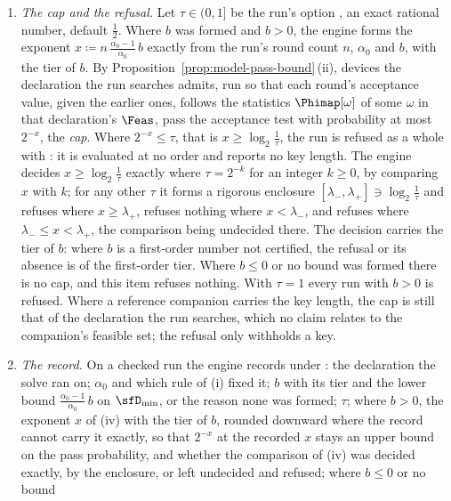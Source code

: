\begin{requirement}
\begin{enumerate}[label=(\roman*),leftmargin=2.4em]
  accounts for. Where $b\le0$, $f(\alpha')\coloneqq0$. Where no bound was
  formed, $f(\alpha')$ is not defined.
\item \emph{The cap and the refusal.} Let $\tau\in(0,1]$ be the run's option
  , an exact rational number, default
  $\frac12$. Where $b$ was formed and $b>0$, the engine forms the exponent
  $x\coloneqq n\,\frac{\alpha_0-1}{\alpha_0}\,b$ exactly from the run's
  round count $n$, $\alpha_0$ and $b$, with the tier of $b$. By
  Proposition~\ref{prop:model-pass-bound}\,(ii), devices the declaration the
  run searches admits, run so that each round's acceptance value, given the
  earlier ones, follows the statistics $\Phimap[\omega]$ of some $\omega$ in
  that declaration's $\Feas$, pass the acceptance test with probability at
  most $2^{-x}$, the \emph{cap}. Where $2^{-x}\le\tau$, that is
  $x\ge\log_2\frac1\tau$, the run is refused as a whole with
  : it is evaluated at no order and
  reports no key length. The engine decides $x\ge\log_2\frac1\tau$ exactly
  where $\tau=2^{-k}$ for an integer $k\ge0$, by comparing $x$ with $k$;
  for any other $\tau$ it forms a rigorous enclosure
  $[\lambda_-,\lambda_+]\ni\log_2\frac1\tau$ and refuses where
  $x\ge\lambda_+$, refuses nothing where $x<\lambda_-$, and refuses where
  $\lambda_-\le x<\lambda_+$, the comparison being undecided there. The
  decision carries the tier of $b$: where $b$ is a first-order number not
  certified, the refusal or its absence is of the first-order tier. Where
  $b\le0$ or no bound was formed there is no cap, and this item refuses
  nothing. With $\tau=1$ every run with $b>0$ is refused. Where a reference
  companion carries the key length, the cap is still that of the
  declaration the run searches, which no claim relates to the companion's
  feasible set; the refusal only withholds a key.
\item \emph{The record.} On a checked run the engine records under
  : the declaration the solve ran on;
  $\alpha_0$ and which rule of (i) fixed it; $b$ with its tier and the lower bound
  $\frac{\alpha_0-1}{\alpha_0}\,b$ on $\sfD_{\min}$, or the reason none was
  formed; $\tau$; where $b>0$, the exponent $x$ of (iv) with the tier of
  $b$, rounded downward where the record cannot carry it exactly, so that
  $2^{-x}$ at the recorded $x$ stays an upper bound on the pass
  probability, and whether the comparison of (iv) was decided exactly, by
  the enclosure, or left undecided and refused; where $b\le0$ or no bound

\end{enumerate}
\end{requirement}
